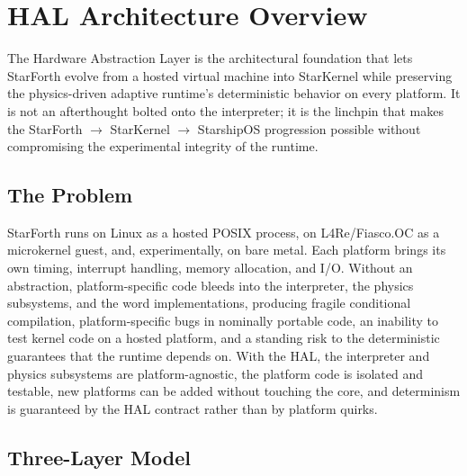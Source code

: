 
\section{HAL Architecture Overview}

The Hardware Abstraction Layer is the architectural foundation that lets
StarForth evolve from a hosted virtual machine into StarKernel while preserving
the physics-driven adaptive runtime's deterministic behavior on every platform.
It is not an afterthought bolted onto the interpreter; it is the linchpin that
makes the StarForth $\rightarrow$ StarKernel $\rightarrow$ StarshipOS
progression possible without compromising the experimental integrity of the
runtime.


\subsection{The Problem}

StarForth runs on Linux as a hosted POSIX process, on L4Re/Fiasco.OC as a
microkernel guest, and, experimentally, on bare metal. Each platform brings its
own timing, interrupt handling, memory allocation, and I/O. Without an
abstraction, platform-specific code bleeds into the interpreter, the physics
subsystems, and the word implementations, producing fragile conditional
compilation, platform-specific bugs in nominally portable code, an inability to
test kernel code on a hosted platform, and a standing risk to the deterministic
guarantees that the runtime depends on. With the HAL, the interpreter and
physics subsystems are platform-agnostic, the platform code is isolated and
testable, new platforms can be added without touching the core, and determinism
is guaranteed by the HAL contract rather than by platform quirks.

\subsection{Three-Layer Model}

